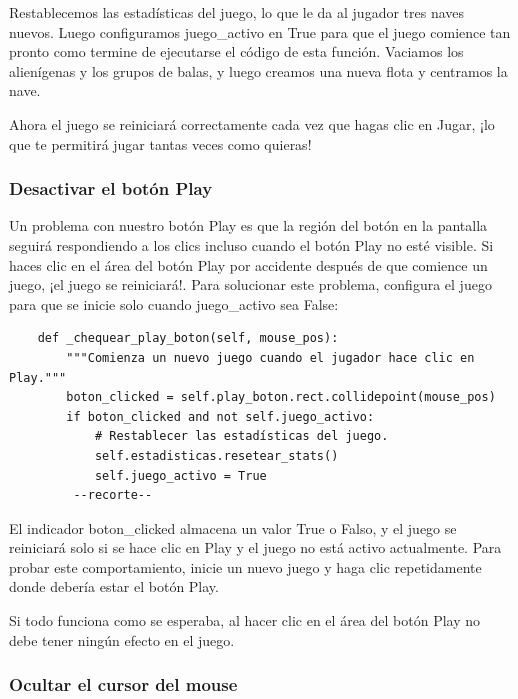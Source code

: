 Restablecemos las estadísticas del juego, lo que le da al jugador tres naves nuevos. Luego configuramos {\ttfamily juego\_activo}
 en True para que el juego comience tan pronto como termine de ejecutarse el código de esta función. Vaciamos los alienígenas y 
 los grupos de balas, y luego creamos una nueva flota y centramos la nave.

Ahora el juego se reiniciará correctamente cada vez que hagas clic en Jugar, ¡lo que te permitirá jugar tantas veces como quieras!


\subsubsection{Desactivar el botón Play}

Un problema con nuestro botón Play es que la región del botón en la pantalla seguirá respondiendo a los clics incluso cuando el botón Play no esté visible. Si haces clic en el área del botón Play  por accidente después de que comience un juego, ¡el juego se reiniciará!. 
Para solucionar este problema, configura el juego para que se inicie solo cuando {\ttfamily juego\_activo} sea False:


\hspace{-2.4cm}{\ttfamily \scriptsize invasión}

\vspace{-0.2cm}
\hspace{-2.1cm}{\ttfamily \scriptsize \_alien.py}\vspace{-0.84cm}
\begin{lstlisting}		
    def _chequear_play_boton(self, mouse_pos):
        """Comienza un nuevo juego cuando el jugador hace clic en Play."""
        boton_clicked = self.play_boton.rect.collidepoint(mouse_pos)
        if boton_clicked and not self.juego_activo: 
            # Restablecer las estadísticas del juego.
            self.estadisticas.resetear_stats()
            self.juego_activo = True
         --recorte--
\end{lstlisting}

El indicador {\ttfamily boton\_clicked} almacena un valor True o Falso, y el juego se reiniciará solo si se hace clic en Play y el juego no está activo actualmente. Para probar este comportamiento, inicie un nuevo juego y haga clic repetidamente donde debería estar el botón Play. 

Si todo funciona como se esperaba, al hacer clic en el área del botón Play no debe  tener ningún efecto en el juego.

\subsubsection{Ocultar el cursor del mouse}

